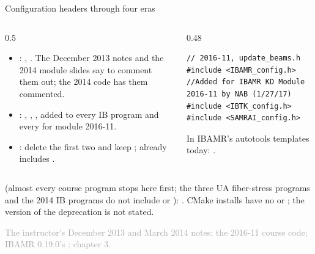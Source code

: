 \documentclass[aspectratio=169,11pt]{beamer}
\newcommand{\sourcecredit}[1]{\vfill\begin{flushright}\tiny\textcolor{DarkGray}{#1}\end{flushright}}
\begin{document}
\begin{frame}[fragile]{Configuration headers through four eras}
\label{fr:config}
\begin{columns}[T,onlytextwidth]
\begin{column}{0.5\textwidth}
\footnotesize
\begin{itemize}\setlength{\itemsep}{2pt}
  \item {}: , . The December 2013 notes and the 2014 module slides say to comment them out; the 2014 code has them commented.
  \item {}: , , , added to every IB program and every  for module 2016-11.
  \item {}: delete the first two and keep ;  already includes .
\end{itemize}
\end{column}
\begin{column}{0.48\textwidth}
\begin{lstlisting}[style=cpptiny]
// 2016-11, update_beams.h
#include <IBAMR_config.h>    //Added for IBAMR KD Module 2016-11 by NAB (1/27/17)
#include <IBTK_config.h>
#include <SAMRAI_config.h>
\end{lstlisting}
\footnotesize In IBAMR's autotools templates today: .
\end{column}
\end{columns}
\vspace{1mm}
\footnotesize {} (almost every course program stops here first; the three UA fiber-stress programs and the 2014 IB programs do not include  or ): . CMake installs have no  or ; the version of the deprecation is not stated.
\sourcecredit{The instructor's December 2013 and March 2014 notes; the 2016-11 course code; IBAMR 0.19.0's \code{config/IBAMR\_config.h.tmp.in}; chapter 3.}
\end{frame}
\end{document}
